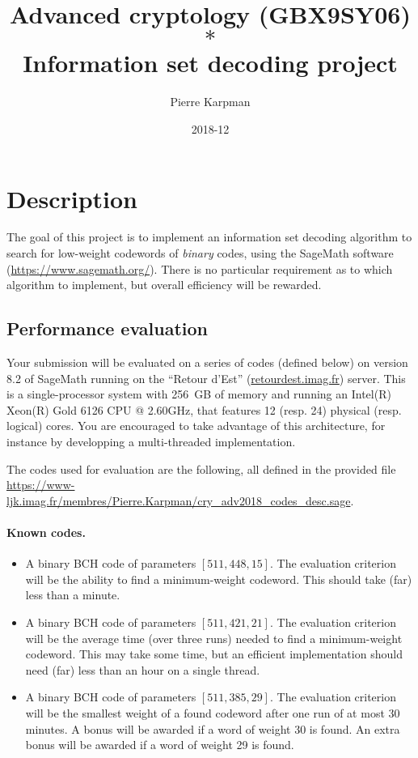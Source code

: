 \documentclass[11pt,a4paper]{article}
\title{Advanced cryptology (GBX9SY06)\\
$\ast$\\
Information set decoding project}
\date{2018-12}
\author{Pierre Karpman}
\theoremstyle{definition}
\begin{document}
\maketitle{}

\section{Description}

The goal of this project is to implement an information set decoding algorithm to search for low-weight codewords of \emph{binary} codes, using the
SageMath software (\url{https://www.sagemath.org/}).
There is no particular requirement as to which algorithm to implement, but overall efficiency will be rewarded.

\subsection*{Performance evaluation}

Your submission will be evaluated on a series of codes (defined below) on version 8.2 of SageMath running on the ``Retour d'Est'' (\url{retourdest.imag.fr})
server. This is a single-processor system with 256~GB of memory and running an Intel(R) Xeon(R) Gold 6126 CPU @ 2.60GHz, that features 12 (resp. 24) physical (resp. logical) cores.
You are encouraged to take advantage of this architecture, for instance by developping a multi-threaded implementation.

The codes used for evaluation are the following, all defined in the provided file \url{https://www-ljk.imag.fr/membres/Pierre.Karpman/cry\_adv2018\_codes\_desc.sage}.
\paragraph{Known codes.}
\begin{itemize}
	\item A binary BCH code of parameters $[511, 448, 15]$. The evaluation criterion will be the ability to find a minimum-weight codeword. This should take (far) less than a minute.
	\item A binary BCH code of parameters $[511, 421, 21]$. The evaluation criterion will be the average time (over three runs) needed to find a minimum-weight codeword. This may take some time, but an efficient implementation should need (far) less than an hour on a single thread.
	\item A binary BCH code of parameters $[511, 385, 29]$. The evaluation criterion will be the smallest weight of a found codeword after one run of at most 30 minutes. A bonus will be awarded if a word of weight 30 is found. An extra
		bonus will be awarded if a word of weight 29 is found.
\end{itemize}
\end{document}
